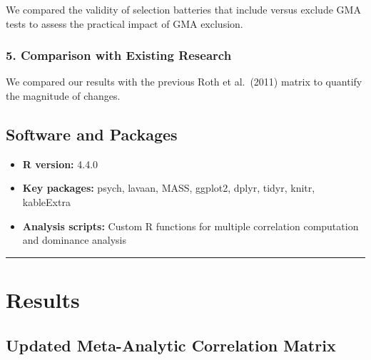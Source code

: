 \documentclass[
]{article}
\providecommand{\tightlist}{%
  \setlength{\itemsep}{0pt}\setlength{\parskip}{0pt}}
\begin{document}
We compared the validity of selection batteries that include versus
exclude GMA tests to assess the practical impact of GMA exclusion.

\subsubsection{5. Comparison with Existing
Research}\label{comparison-with-existing-research}

We compared our results with the previous Roth et al.~(2011) matrix to
quantify the magnitude of changes.

\subsection{Software and Packages}\label{software-and-packages}

\begin{itemize}
\tightlist
\item
  \textbf{R version:} 4.4.0
\item
  \textbf{Key packages:} psych, lavaan, MASS, ggplot2, dplyr, tidyr,
  knitr, kableExtra
\item
  \textbf{Analysis scripts:} Custom R functions for multiple correlation
  computation and dominance analysis
\end{itemize}

\begin{center}\rule{0.5\linewidth}{0.5pt}\end{center}

\section{Results}\label{results}

\subsection{Updated Meta-Analytic Correlation
Matrix}\label{updated-meta-analytic-correlation-matrix}

\begingroup\fontsize{10}{12}\selectfont
\end{document}
